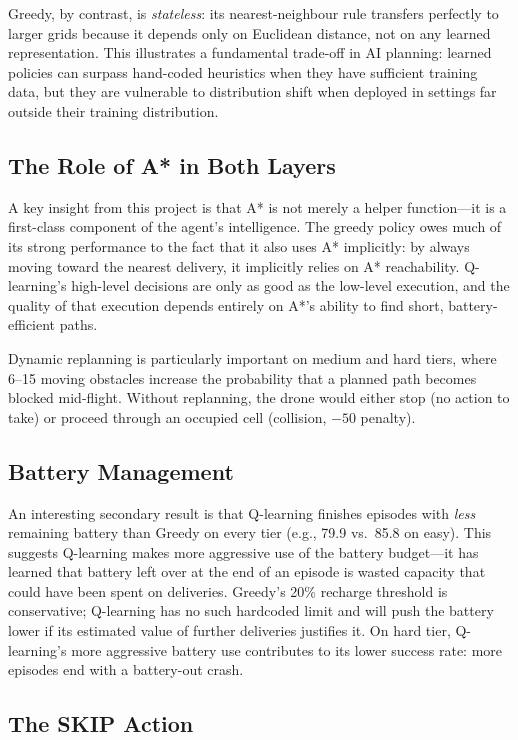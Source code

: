 \documentclass[11pt,twocolumn]{article}
\begin{document}
Greedy, by contrast, is \emph{stateless}: its nearest-neighbour rule
transfers perfectly to larger grids because it depends only on
Euclidean distance, not on any learned representation.
This illustrates a fundamental trade-off in AI planning: learned
policies can surpass hand-coded heuristics when they have sufficient
training data, but they are vulnerable to distribution shift when
deployed in settings far outside their training distribution.

\subsection{The Role of A* in Both Layers}

A key insight from this project is that A* is not merely a helper
function---it is a first-class component of the agent's intelligence.
The greedy policy owes much of its strong performance to the fact that
it also uses A* implicitly: by always moving toward the nearest
delivery, it implicitly relies on A* reachability.
Q-learning's high-level decisions are only as good as the low-level
execution, and the quality of that execution depends entirely on A*'s
ability to find short, battery-efficient paths.

Dynamic replanning is particularly important on medium and hard tiers,
where 6--15 moving obstacles increase the probability that a planned
path becomes blocked mid-flight.
Without replanning, the drone would either stop (no action to take)
or proceed through an occupied cell (collision, $-50$ penalty).

\subsection{Battery Management}

An interesting secondary result is that Q-learning finishes episodes
with \emph{less} remaining battery than Greedy on every tier (e.g.,
79.9 vs.\ 85.8 on easy).
This suggests Q-learning makes more aggressive use of the battery
budget---it has learned that battery left over at the end of an episode
is wasted capacity that could have been spent on deliveries.
Greedy's 20\% recharge threshold is conservative; Q-learning has no
such hardcoded limit and will push the battery lower if its estimated
value of further deliveries justifies it.
On hard tier, Q-learning's more aggressive battery use contributes to
its lower success rate: more episodes end with a battery-out crash.

\subsection{The SKIP Action}
\end{document}
